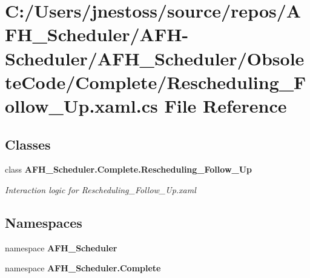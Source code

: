 \section{C\+:/\+Users/jnestoss/source/repos/\+A\+F\+H\+\_\+\+Scheduler/\+A\+F\+H-\/\+Scheduler/\+A\+F\+H\+\_\+\+Scheduler/\+Obsolete\+Code/\+Complete/\+Rescheduling\+\_\+\+Follow\+\_\+\+Up.xaml.\+cs File Reference}
\label{_rescheduling___follow___up_8xaml_8cs}
\subsection*{Classes}
\begin{DoxyCompactItemize}
\item 
class \textbf{ A\+F\+H\+\_\+\+Scheduler.\+Complete.\+Rescheduling\+\_\+\+Follow\+\_\+\+Up}
\begin{DoxyCompactList}\small\item\em Interaction logic for Rescheduling\+\_\+\+Follow\+\_\+\+Up.\+xaml \end{DoxyCompactList}\end{DoxyCompactItemize}
\subsection*{Namespaces}
\begin{DoxyCompactItemize}
\item 
namespace \textbf{ A\+F\+H\+\_\+\+Scheduler}
\item 
namespace \textbf{ A\+F\+H\+\_\+\+Scheduler.\+Complete}
\end{DoxyCompactItemize}
